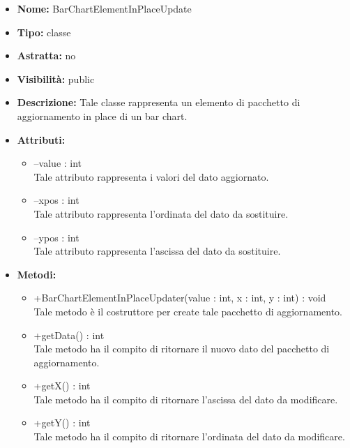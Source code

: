 			
			\begin{itemize}
			\item \textbf{Nome:} BarChartElementInPlaceUpdate
			\item \textbf{Tipo:} classe
			
		\item \textbf{Astratta:}
		no
			\item \textbf{Visibilità:} public
			\item \textbf{Descrizione:} Tale classe rappresenta un elemento di pacchetto di aggiornamento in place di un bar chart.
			\item \textbf{Attributi:}
				\begin{itemize}
				\setlength{\itemsep}{5pt}
				
					\item[\ding{111}] {--value : int} \\ [1mm] Tale attributo rappresenta i valori del dato aggiornato.
					\item[\ding{111}] {--xpos : int} \\ [1mm] Tale attributo rappresenta l'ordinata del dato da sostituire.
					\item[\ding{111}] {--ypos : int} \\ [1mm] Tale attributo rappresenta l'ascissa del dato da sostituire.
				\end{itemize}
		
			\item \textbf{Metodi:}
				\begin{itemize}
				\setlength{\itemsep}{5pt}
				
					\item[\ding{111}] {{+BarChartElementInPlaceUpdater(value : int, x : int, y : int) : void}} \\ [1mm] Tale metodo è il costruttore per create tale pacchetto di aggiornamento.
					\item[\ding{111}] {{+getData() : int}} \\ [1mm] Tale metodo ha il compito di ritornare il nuovo dato del pacchetto di aggiornamento.
					\item[\ding{111}] {{+getX() : int}} \\ [1mm] Tale metodo ha il compito di ritornare l'ascissa del dato da modificare.
					\item[\ding{111}] {{+getY() : int}} \\ [1mm] Tale metodo ha il compito di ritornare l'ordinata del dato da modificare.
				\end{itemize}
		
			\end{itemize}
	
